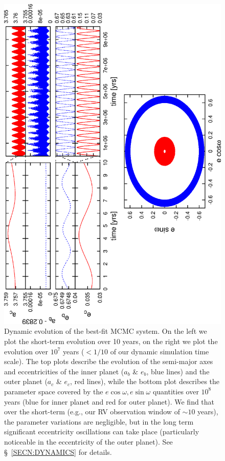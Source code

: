 \begin{figure}
\center
\includegraphics[angle=270,scale=0.5]{37605/f4.eps}
\caption{Dynamic evolution of the best-fit MCMC system.
%
On the left we plot the short-term evolution over 10 years, on the
right we plot the evolution over $10^7$ years ($<1/10$ of our dynamic
simulation time scale).
%
The top plots describe the evolution of the semi-major axes and
eccentricities of the inner planet ($a_b$ \& $e_b$, blue lines) and
the outer planet ($a_c$ \& $e_c$, red lines), while the bottom plot
describes the parameter space covered by the $e\cos{\omega},
e\sin{\omega}$ quantities over $10^8$ years (blue for inner planet and
red for outer planet).
% 
We find that over the short-term (e.g., our RV observation window of
$\sim 10$ years), the parameter variations are negligible, but in the
long term significant eccentricity oscillations can take place
(particularly noticeable in the eccentricity of the outer planet).
%
See \S~\ref{SECN:DYNAMICS} for details.
\label{dynamicplot}}
\end{figure}



